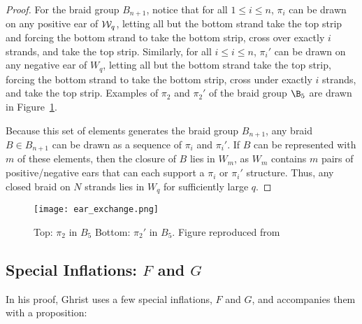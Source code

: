 \documentclass[paper.tex]{subfiles}
\begin{document}
\begin{proof}

    For the braid group $B_{n+1}$, notice that for all $1 \leq i \leq n$, $\pi_i$ can be drawn on any positive ear of $\mathcal{W}_q$, letting all but the bottom strand take the top strip and forcing the bottom strand to take the bottom strip, cross over exactly $i$ strands, and take the top strip. Similarly, for all $i \leq i \leq n$, $\pi_i'$ can be drawn on any negative ear of $W_q$, letting all but the bottom strand take the top strip, forcing the bottom strand to take the bottom strip, cross under exactly $i$ strands, and take the top strip. Examples of $\pi_2$ and $\pi_2'$ of the braid group $\B_5$ are drawn in Figure~\ref{fig:earexchange}. 

    Because this set of elements generates the braid group $B_{n+1}$, any braid $B \in B_{n+1}$ can be drawn as a sequence of $\pi_i$ and $\pi_i'$. If $B$ can be represented with $m$ of these elements, then the closure of $B$ lies in $W_m$, as $W_m$ contains $m$ pairs of positive/negative ears that can each support a $\pi_i$ or $\pi_i'$ structure. Thus, any closed braid on $N$ strands lies in $W_q$ for sufficiently large $q$. 

\end{proof}



\begin{figure}[h]
  \centering
  \texttt{[image: ear\_exchange.png]}
  \caption{Top: $\pi_2$ in $B_5$ Bottom: $\pi_2'$ in $B_5$. Figure reproduced from~\cite{Ghrist1996}}\label{fig:earexchange}
\end{figure}








\subsection{Special Inflations: $F$ and $G$}

In his proof, Ghrist uses a few special inflations, $F$ and $G$, and accompanies them with a proposition: 
\end{document}
